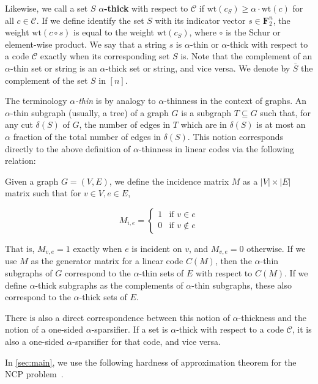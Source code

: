 \documentclass{article}
\newcommand{\FF}{\mathbf{F}}
\newcommand{\calC}{\mathcal{C}}
\newcommand{\wt}{\text{wt}}
\begin{document}
Likewise, we call a set $S$ \textbf{$\alpha$-thick} with respect to $\calC$ if $\wt(c_S) \geq \alpha \cdot \wt(c)$ for all $c \in \calC$. If we define identify the set $S$ with its indicator vector $s \in \FF_2^n$, the weight $\wt(c \circ s)$ is equal to the weight $\wt(c_S)$, where $\circ$ is the Schur or element-wise product. We say that a string $s$ is $\alpha$-thin or $\alpha$-thick with respect to a code $\calC$ exactly when its corresponding set $S$ is. Note that the complement of an $\alpha$-thin set or string is an $\alpha$-thick set or string, and vice versa. We denote by ${\bar S}$ the complement of the set $S$ in $[n]$.

The terminology \textit{$\alpha$-thin} is by analogy to $\alpha$-thinness in the context of graphs. An $\alpha$-thin subgraph (usually, a tree) of a graph $G$ is a subgraph $T \subseteq G$ such that, for any cut $\delta(S)$ of $G$, the number of edges in $T$ which are in $\delta(S)$ is at most an $\alpha$ fraction of the total number of edges in $\delta(S)$. This notion corresponds directly to the above definition of $\alpha$-thinness in linear codes via the following relation:

Given a graph $G = (V,E)$, we define the incidence matrix $M$ as a $|V|\times |E|$ matrix such that for $v \in V, e \in E$,

\[M_{i,e} =
    \begin{cases}
        1&\text{if } v\in e\\
        0&\text{if } v\notin e
    \end{cases}
\]

That is, $M_{v,e} = 1$ exactly when $e$ is incident on $v$, and $M_{v,e}=0$ otherwise. If we use $M$ as the generator matrix for a linear code $C(M)$, then the $\alpha$-thin subgraphs of $G$ correspond to the $\alpha$-thin sets of $E$ with respect to $C(M)$. If we define $\alpha$-thick subgraphs as the complements of $\alpha$-thin subgraphs, these also correspond to the $\alpha$-thick sets of $E$.

There is also a direct correspondence between this notion of $\alpha$-thickness and the notion of a one-sided $\alpha$-sparsifier. If a set is $\alpha$-thick with respect to a code $\calC$, it is also a one-sided $\alpha$-sparsifier for that code, and vice versa.

In \cref{sec:main}, we use the following hardness of approximation theorem for the NCP problem~\cite{vardy1997intractability,dumer2003approx,Khot05,
AustrinKhot,Micciancio2014,BhattiproluLee24, bhattiproluGLR2025}.
\end{document}
